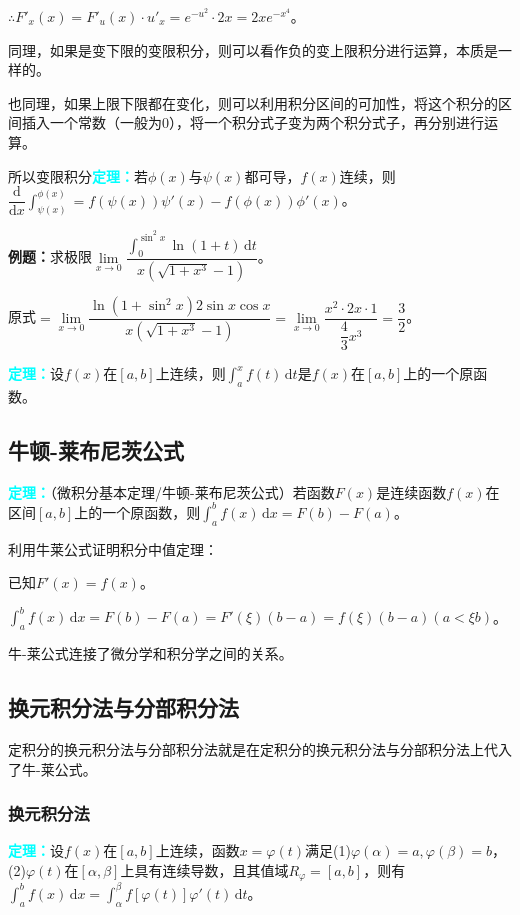 \documentclass[UTF8, 12pt]{ctexart}
\begin{document}
$\therefore F'_x(x)=F'_u(x)\cdot u'_x=e^{-u^2}\cdot 2x=2xe^{-x^4}$。

同理，如果是变下限的变限积分，则可以看作负的变上限积分进行运算，本质是一样的。

也同理，如果上限下限都在变化，则可以利用积分区间的可加性，将这个积分的区间插入一个常数（一般为0），将一个积分式子变为两个积分式子，再分别进行运算。

所以变限积分\textcolor{aqua}{\textbf{定理：}}若$\phi(x)$与$\psi(x)$都可导，$f(x)$连续，则$\dfrac{\textrm{d}}{\textrm{d}x}\int_{\psi(x)}^{\phi(x)}=f(\psi(x))\psi'(x)-f(\phi(x))\phi'(x)$。

\textbf{例题：}求极限$\lim\limits_{x\to 0}\dfrac{\int_0^{\sin^2x}\ln(1+t)\,\textrm{d}t}{x(\sqrt{1+x^3}-1)}$。

原式$=\lim\limits_{x\to 0}\dfrac{\ln(1+\sin^2x)2\sin x\cos x}{x(\sqrt{1+x^3}-1)}=\lim\limits_{x\to 0}\dfrac{x^2\cdot 2x\cdot 1}{\dfrac{4}{3}x^3}=\dfrac{3}{2}$。\smallskip

\textcolor{aqua}{\textbf{定理：}}设$f(x)$在$[a,b]$上连续，则$\int_a^xf(t)\,\textrm{d}t$是$f(x)$在$[a,b]$上的一个原函数。

\subsection{牛顿-莱布尼茨公式}

\textcolor{aqua}{\textbf{定理：}}（微积分基本定理/牛顿-莱布尼茨公式）若函数$F(x)$是连续函数$f(x)$在区间$[a,b]$上的一个原函数，则$\int_a^bf(x)\,\textrm{d}x=F(b)-F(a)$。

利用牛莱公式证明积分中值定理：

已知$F'(x)=f(x)$。

$\int_a^bf(x)\,\textrm{d}x=F(b)-F(a)=F'(\xi)(b-a)=f(\xi)(b-a)(a<\xi b)$。

牛-莱公式连接了微分学和积分学之间的关系。

\subsection{换元积分法与分部积分法}

定积分的换元积分法与分部积分法就是在定积分的换元积分法与分部积分法上代入了牛-莱公式。

\subsubsection{换元积分法}

\textcolor{aqua}{\textbf{定理：}}设$f(x)$在$[a,b]$上连续，函数$x=\varphi(t)$满足(1)$\varphi(\alpha)=a,\varphi(\beta)=b$，(2)$\varphi(t)$在$[\alpha,\beta]$上具有连续导数，且其值域$R_\varphi=[a,b]$，则有$\int_a^bf(x)\,\textrm{d}x=\int_\alpha^\beta f[\varphi(t)]\varphi'(t)\,\textrm{d}t$。
\end{document}
